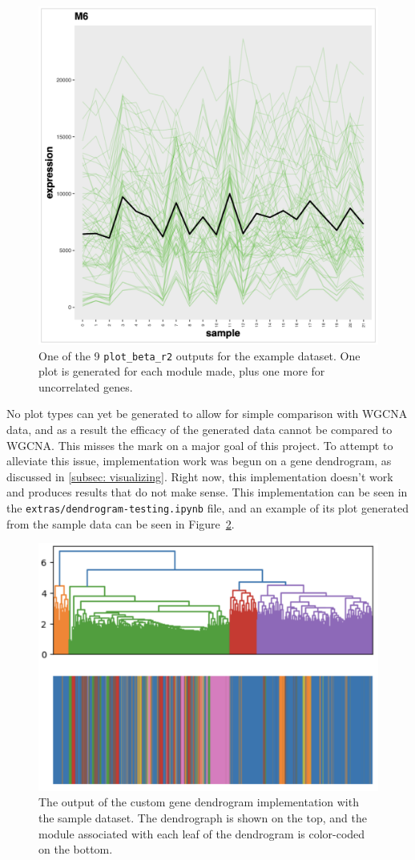 \begin{figure}[!htb]
    \centering
    \includegraphics[width=0.7\linewidth]{images/profile_plot}
    \caption{One of the 9 \texttt{plot\_beta\_r2} outputs for the example dataset. One plot is generated for each module made, plus one more for uncorrelated genes.}
    \label{fig:profile}
\end{figure}

No plot types can yet be generated to allow for simple comparison with WGCNA data, and as a result the efficacy of the generated data cannot be compared to WGCNA. This misses the mark on a major goal of this project. To attempt to alleviate this issue, implementation work was begun on a gene dendrogram, as discussed in \ref{subsec: visualizing}. Right now, this implementation doesn't work and produces results that do not make sense. This implementation can be seen in the \texttt{extras/dendrogram-testing.ipynb} file, and an example of its plot generated from the sample data can be seen in Figure~\ref{fig:dendrogram}.

\begin{figure}[!htb]
    \centering
    \includegraphics[width=0.7\linewidth]{images/my_dendrogram}
    \caption{The output of the custom gene dendrogram implementation with the sample dataset. The dendrograph is shown on the top, and the module associated with each leaf of the dendrogram is color-coded on the bottom.}
    \label{fig:dendrogram}
\end{figure}


